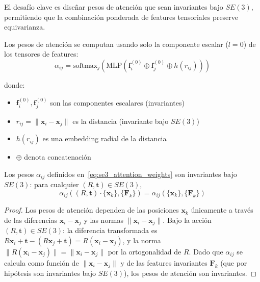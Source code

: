 El desafío clave es diseñar pesos de atención que sean invariantes bajo $SE(3)$, permitiendo que la combinación ponderada de features tensoriales preserve equivarianza.

Los pesos de atención se computan usando solo la componente escalar ($l=0$) de los tensores de features:
\begin{equation}\label{eq:se3_attention_weights}
\alpha_{ij} = \text{softmax}_j\left(\text{MLP}\left(\mathbf{f}_i^{(0)} \oplus \mathbf{f}_j^{(0)} \oplus h(r_{ij})\right)\right)
\end{equation}

donde:
\begin{itemize}
    \item $\mathbf{f}_i^{(0)}, \mathbf{f}_j^{(0)}$ son las componentes escalares (invariantes)
    \item $r_{ij} = \|\mathbf{x}_i - \mathbf{x}_j\|$ es la distancia (invariante bajo $SE(3)$)
    \item $h(r_{ij})$ es una embedding radial de la distancia
    \item $\oplus$ denota concatenación
\end{itemize}

\begin{proposition}
Los pesos $\alpha_{ij}$ definidos en~\eqref{eq:se3_attention_weights} son invariantes bajo $SE(3)$: para cualquier $(R, \mathbf{t}) \in SE(3)$,
\begin{equation}
\alpha_{ij}((R, \mathbf{t}) \cdot \{\mathbf{x}_k\}, \{\mathbf{F}_k\}) = \alpha_{ij}(\{\mathbf{x}_k\}, \{\mathbf{F}_k\})
\end{equation}
\end{proposition}

\begin{proof}
Los pesos de atención dependen de las posiciones $\mathbf{x}_k$ únicamente a través de las diferencias $\mathbf{x}_i - \mathbf{x}_j$ y las normas $\|\mathbf{x}_i - \mathbf{x}_j\|$. Bajo la acción $(R, \mathbf{t}) \in SE(3)$: la diferencia transformada es $R\mathbf{x}_i + \mathbf{t} - (R\mathbf{x}_j + \mathbf{t}) = R(\mathbf{x}_i - \mathbf{x}_j)$, y la norma $\|R(\mathbf{x}_i - \mathbf{x}_j)\| = \|\mathbf{x}_i - \mathbf{x}_j\|$ por la ortogonalidad de $R$. Dado que $\alpha_{ij}$ se calcula como función de $\|\mathbf{x}_i - \mathbf{x}_j\|$ y de las features invariantes $\mathbf{F}_k$ (que por hipótesis son invariantes bajo $SE(3)$), los pesos de atención son invariantes.
\end{proof}

